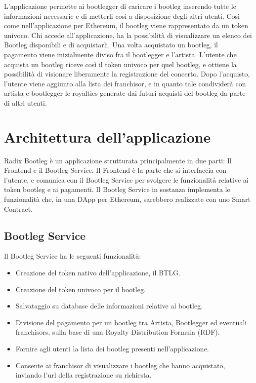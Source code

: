 L'applicazione permette ai bootlegger di caricare i bootleg inserendo tutte le informazioni necessarie e di metterli così a disposizione degli altri utenti. Così come nell'applicazione per Ethereum, il bootleg viene rappresentato da un token univoco. Chi accede all'applicazione, ha la possibilità di visualizzare un elenco dei Bootleg disponibili e di acquistarli. Una volta acquistato un bootleg, il pagamento viene inizialmente diviso fra il bootlegger e l'artista. L'utente che acquista un bootleg riceve così il token univoco per quel bootleg, e ottiene la possibilità di visionare liberamente la registrazione del concerto. Dopo l'acquisto, l'utente viene aggiunto alla lista dei franchisor, e in quanto tale condividerà con artista e bootlegger le royalties generate dai futuri acquisti del bootleg da parte di altri utenti.

\section{Architettura dell'applicazione}

Radix Bootleg è un applicazione strutturata principalmente in due parti: Il Frontend e il Bootleg Service. Il Frontend è la parte che si interfaccia con l'utente, e comunica con il Bootleg Service per svolgere le funzionalità relative ai token bootleg e ai pagamenti. Il Bootleg Service in sostanza implementa le funzionalità che, in una DApp per Ethereum, sarebbero realizzate con uno Smart Contract.

\subsection{Bootleg Service}

Il Bootleg Service ha le seguenti funzionalità:
\begin{itemize}
    \item Creazione del token nativo dell'applicazione, il BTLG.
    \item Creazione del token univoco per il bootleg.
    \item Salvataggio su database delle informazioni relative al bootleg.
    \item Divisione del pagamento per un bootleg tra Artista, Bootlegger ed eventuali franchisors, sulla base di una Royalty Distribution Formula (RDF).
    \item Fornire agli utenti la lista dei bootleg presenti nell'applicazione.
    \item Consente ai franchisor di visualizzare i bootleg che hanno acquistato, inviando l'url della registrazione su richiesta.
\end{itemize}

